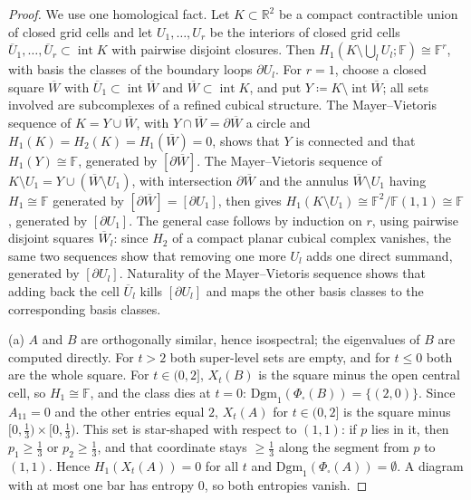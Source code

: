 \documentclass[11pt,a4paper,reqno]{amsart}
\theoremstyle{definition}
\numberwithin{equation}{section}
\newcommand{\R}{\mathbb{R}}
\begin{document}
\begin{proof}
We use one homological fact. Let $K \subset \R^2$ be a compact contractible union of closed grid cells and let $U_1, \dots, U_r$ be the interiors of closed grid cells $\overline{U}_1, \dots, \overline{U}_r \subset \operatorname{int} K$ with pairwise disjoint closures. Then $H_1(K \setminus \bigcup_l U_l; \mathbb{F}) \cong \mathbb{F}^r$, with basis the classes of the boundary loops $\partial U_l$. For $r = 1$, choose a closed square $\overline{W}$ with $\overline{U}_1 \subset \operatorname{int}\overline{W}$ and $\overline{W} \subset \operatorname{int} K$, and put $Y \coloneqq K \setminus \operatorname{int}\overline{W}$; all sets involved are subcomplexes of a refined cubical structure. The Mayer--Vietoris sequence of $K = Y \cup \overline{W}$, with $Y \cap \overline{W} = \partial\overline{W}$ a circle and $H_1(K) = H_2(K) = H_1(\overline{W}) = 0$, shows that $Y$ is connected and that $H_1(Y) \cong \mathbb{F}$, generated by $[\partial\overline{W}]$. The Mayer--Vietoris sequence of $K \setminus U_1 = Y \cup (\overline{W} \setminus U_1)$, with intersection $\partial\overline{W}$ and the annulus $\overline{W} \setminus U_1$ having $H_1 \cong \mathbb{F}$ generated by $[\partial\overline{W}] = [\partial U_1]$, then gives $H_1(K \setminus U_1) \cong \mathbb{F}^2 / \mathbb{F}(1,1) \cong \mathbb{F}$, generated by $[\partial U_1]$. The general case follows by induction on $r$, using pairwise disjoint squares $\overline{W}_l$: since $H_2$ of a compact planar cubical complex vanishes, the same two sequences show that removing one more $U_l$ adds one direct summand, generated by $[\partial U_l]$. Naturality of the Mayer--Vietoris sequence shows that adding back the cell $\overline{U}_l$ kills $[\partial U_l]$ and maps the other basis classes to the corresponding basis classes.

(a) $A$ and $B$ are orthogonally similar, hence isospectral; the eigenvalues of $B$ are computed directly. For $t > 2$ both super-level sets are empty, and for $t \le 0$ both are the whole square. For $t \in (0,2]$, $X_t(B)$ is the square minus the open central cell, so $H_1 \cong \mathbb{F}$, and the class dies at $t = 0$: $\mathrm{Dgm}_1(\Phi_\square(B)) = \{(2,0)\}$. Since $A_{11} = 0$ and the other entries equal $2$, $X_t(A)$ for $t \in (0,2]$ is the square minus $[0,\frac13) \times [0, \frac13)$. This set is star-shaped with respect to $(1,1)$: if $p$ lies in it, then $p_1 \ge \frac13$ or $p_2 \ge \frac13$, and that coordinate stays $\ge \frac13$ along the segment from $p$ to $(1,1)$. Hence $H_1(X_t(A)) = 0$ for all $t$ and $\mathrm{Dgm}_1(\Phi_\square(A)) = \emptyset$. A diagram with at most one bar has entropy $0$, so both entropies vanish.


\end{proof}
\end{document}

